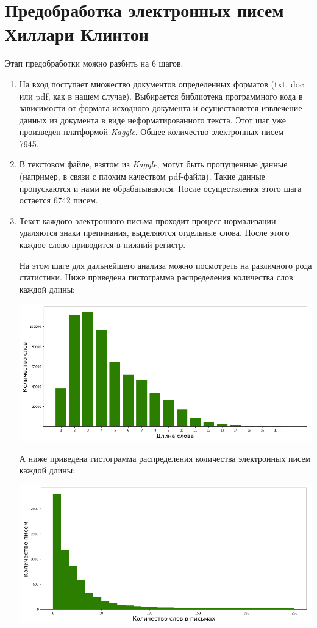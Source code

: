 
\section{Предобработка электронных писем Хиллари Клинтон}

Этап предобработки можно разбить на 6 шагов.

\begin{enumerate}

\item На вход поступает множество документов определенных форматов (txt, doc или pdf, как в нашем случае). Выбирается библиотека программного кода в зависимости от формата исходного документа и осуществляется извлечение данных из документа в виде неформатированного текста. Этот шаг уже произведен платформой \textit{Kaggle}. Общее количество электронных писем --- 7945.

\item В текстовом файле, взятом из \textit{Kaggle}, могут быть пропущенные данные (например, в связи с плохим качеством pdf-файла). Такие данные пропускаются и нами не обрабатываются. После осуществления этого шага остается 6742 писем. 

\item Текст каждого электронного письма проходит процесс нормализации --- удаляются знаки препинания, выделяются отдельные слова. После этого каждое слово приводится в нижний регистр. 

На этом шаге для дальнейшего анализа можно посмотреть на различного рода статистики.
Ниже приведена гистограмма распределения количества слов каждой длины: 

\includegraphics[scale=0.5]{pics/word_lengths.png}

А ниже приведена гистограмма распределения количества электронных писем каждой длины: 

\includegraphics[scale=0.5]{pics/email_lengths.png}


\end{enumerate}
